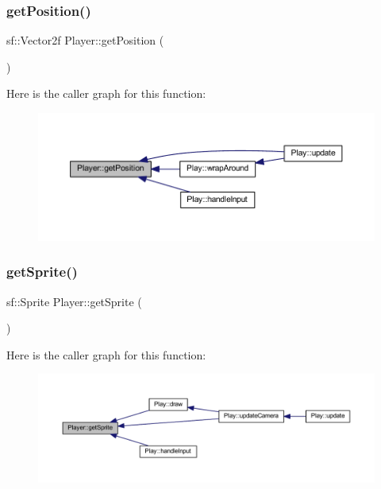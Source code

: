 \subsubsection{\texorpdfstring{get\+Position()}{getPosition()}}
{\footnotesize\ttfamily sf\+::\+Vector2f Player\+::get\+Position (\begin{DoxyParamCaption}{ }\end{DoxyParamCaption})}

Here is the caller graph for this function\+:
\nopagebreak
\begin{figure}[H]
\begin{center}
\leavevmode
\includegraphics[width=350pt]{class_player_a23356f99a9de86d3d47eadb679b332dc_icgraph}
\end{center}
\end{figure}
\mbox{\label{class_player_aabef659f696be314cdb705a1ce77ec2a}} 
\subsubsection{\texorpdfstring{get\+Sprite()}{getSprite()}}
{\footnotesize\ttfamily sf\+::\+Sprite Player\+::get\+Sprite (\begin{DoxyParamCaption}{ }\end{DoxyParamCaption})}

Here is the caller graph for this function\+:
\nopagebreak
\begin{figure}[H]
\begin{center}
\leavevmode
\includegraphics[width=350pt]{class_player_aabef659f696be314cdb705a1ce77ec2a_icgraph}
\end{center}
\end{figure}
\mbox{\label{class_player_a4d9c040f4b766e3052369bae0fd116d7}} 
